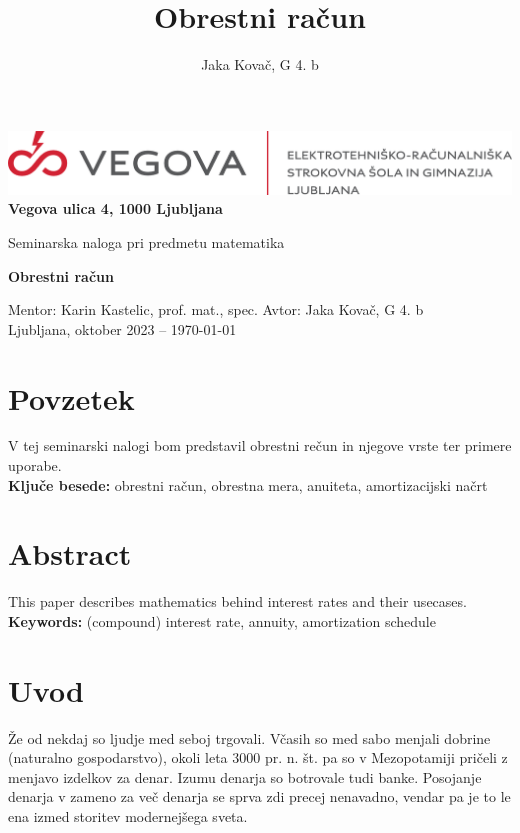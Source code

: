 \documentclass[12pt]{article}
\title{Obrestni račun}
\author{Jaka Kovač, G 4. b}
\begin{document}

\begin{center}
    \thispagestyle{empty}
    \includegraphics[scale=1]{slike/logotip_vegova_leze_brezokvirja.png}
    \\
    \textbf{Vegova ulica 4, 1000 Ljubljana}

    \vspace{\fill} 
    Seminarska naloga pri predmetu matematika

    \Huge{\textbf{Obrestni račun}}

    \normalsize
    \vspace{\fill}

    Mentor: Karin Kastelic, prof. mat., spec. \hfill Avtor: Jaka Kovač, G 4. b\\
    \null
    Ljubljana, oktober 2023 – \MMYYYYdate\today 
\end{center}
\newpage
\thispagestyle{empty}
\null
\newpage

\section*{Povzetek}
V tej seminarski nalogi bom predstavil obrestni rečun in njegove vrste ter primere uporabe.
\\ %
\textbf{Ključe besede:} obrestni račun, obrestna mera, anuiteta, amortizacijski načrt

\vfill
\section*{Abstract}
\foreignlanguage{english}{This paper describes mathematics behind interest rates and their
usecases.
\\ %
\textbf{Keywords:} (compound) interest rate, annuity, amortization schedule}
\vfill

\newpage
\thispagestyle{empty} %
\tableofcontents %
\listoffigures   %
\listoftables    %

\newpage
\section{Uvod}
Že od nekdaj so ljudje med seboj trgovali. Včasih so med sabo menjali dobrine (naturalno 
gospodarstvo), okoli leta 3000 pr. n. št. pa so v Mezopotamiji \cite{wiki:money} pričeli
z menjavo izdelkov za denar. Izumu denarja so botrovale tudi banke. Posojanje denarja v 
zameno za več denarja se sprva zdi precej nenavadno, vendar pa je to le ena izmed storitev
modernejšega sveta. 
\end{document}
